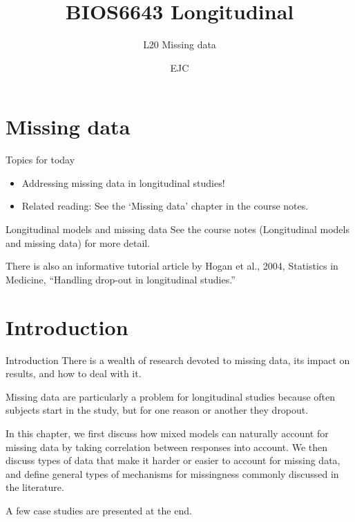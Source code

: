 \documentclass[
  9pt,
  ignorenonframetext,
]{beamer}
\title{BIOS6643 Longitudinal}
\subtitle{L20 Missing data}
\author{EJC}
\date{}
\institute{Department of Biostatistics \& Informatics}
\providecommand{\tightlist}{%
  \setlength{\itemsep}{0pt}\setlength{\parskip}{0pt}}
\begin{document}
\frame{\titlepage}

\begin{frame}[allowframebreaks]
  \tableofcontents[hideallsubsections]
\end{frame}
\hypertarget{missing-data}{%
\section{Missing data}\label{missing-data}}

\begin{frame}{Topics for today}
\protect\hypertarget{topics-for-today}{}
\begin{itemize}
\tightlist
\item
  Addressing missing data in longitudinal studies!
\end{itemize}

\vspace{\baselineskip}

\begin{itemize}
\tightlist
\item
  Related reading: See the `Missing data' chapter in the course notes.
\end{itemize}
\end{frame}

\begin{frame}{Longitudinal models and missing data}
\protect\hypertarget{longitudinal-models-and-missing-data}{}
See the course notes (Longitudinal models and missing data) for more
detail.

There is also an informative tutorial article by Hogan et al., 2004,
Statistics in Medicine, ``Handling drop-out in longitudinal studies.''
\end{frame}

\hypertarget{introduction}{%
\section{Introduction}\label{introduction}}

\begin{frame}{Introduction}
\protect\hypertarget{introduction-1}{}
There is a wealth of research devoted to missing data, its impact on
results, and how to deal with it.

Missing data are particularly a problem for longitudinal studies because
often subjects start in the study, but for one reason or another they
dropout.

In this chapter, we first discuss how mixed models can naturally account
for missing data by taking correlation between responses into account.
We then discuss types of data that make it harder or easier to account
for missing data, and define general types of mechanisms for missingness
commonly discussed in the literature.

A few case studies are presented at the end.
\end{frame}
\end{document}

